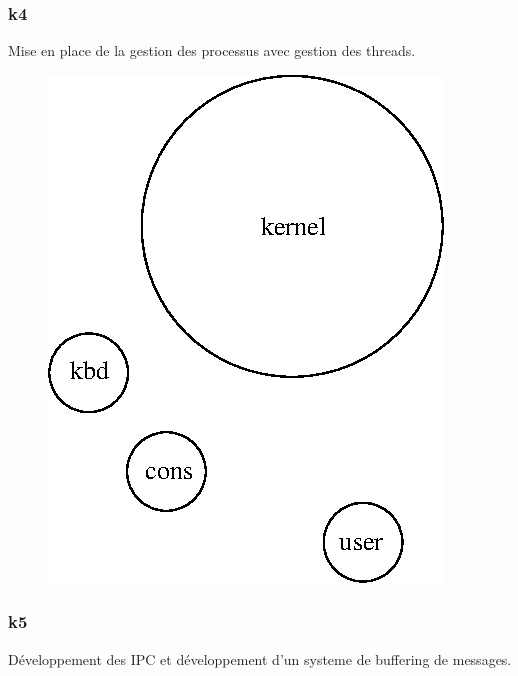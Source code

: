 \documentclass[10pt,a4wide]{article}
\begin{document}
\newpage

\subsubsection{k4}

Mise en place de la gestion des processus avec gestion des threads.

\vspace{5cm}

\begin{figure}[h]
\centerline{\includegraphics{figures/k4.eps}}
\end{figure}

\newpage

\subsubsection{k5}

D\'eveloppement des IPC et d\'eveloppement d'un systeme de buffering de
messages.

\vspace{5cm}
\end{document}
